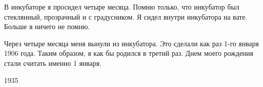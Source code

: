 В инкубаторе я просидел четыре месяца. Помню только, что инкубатор был стеклянный, прозрачный и с градусником. Я сидел внутри инкубатора на вате. Больше я ничего не помню.

Через четыре месяца меня вынули из инкубатора. Это сделали как раз 1-го января 1906 года. Таким образом, я как бы родился в третий раз. Днем моего рождения стали считать именно 1 января.

1935